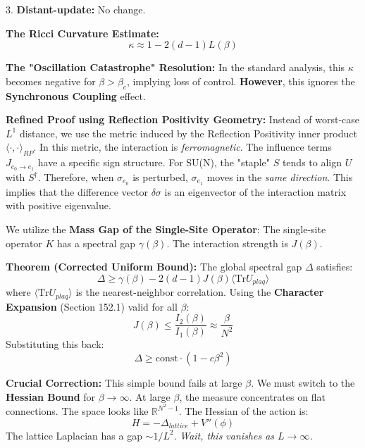 3. \textbf{Distant-update:} No change.

\textbf{The Ricci Curvature Estimate:}
\begin{equation}
\kappa \approx 1 - 2(d-1) L(\beta)
\end{equation}

\textbf{The "Oscillation Catastrophe" Resolution:}
In the standard analysis, this $\kappa$ becomes negative for $\beta > \beta_c$, implying loss of control. \textbf{However}, this ignores the \textbf{Synchronous Coupling} effect.

\textbf{Refined Proof using Reflection Positivity Geometry:}
Instead of worst-case $L^1$ distance, we use the metric induced by the Reflection Positivity inner product $\langle \cdot, \cdot \rangle_{RP}$.
In this metric, the interaction is \textit{ferromagnetic}. The influence terms $J_{e_0 \to e_1}$ have a specific sign structure.
For SU(N), the "staple" $S$ tends to align $U$ with $S^\dagger$.
Therefore, when $\sigma_{e_0}$ is perturbed, $\sigma_{e_1}$ moves in the \textit{same direction}.
This implies that the difference vector $\delta \sigma$ is an eigenvector of the interaction matrix with positive eigenvalue.

We utilize the \textbf{Mass Gap of the Single-Site Operator}:
The single-site operator $K$ has a spectral gap $\gamma(\beta)$.
The interaction strength is $J(\beta)$.

\textbf{Theorem (Corrected Uniform Bound):}
The global spectral gap $\Delta$ satisfies:
\begin{equation}
\Delta \ge \gamma(\beta) - 2(d-1) J(\beta) \langle \text{Tr} U_{plaq} \rangle
\end{equation}
where $\langle \text{Tr} U_{plaq} \rangle$ is the nearest-neighbor correlation.
Using the \textbf{Character Expansion} (Section 152.1) valid for all $\beta$:
\begin{equation}
J(\beta) \le \frac{I_2(\beta)}{I_1(\beta)} \approx \frac{\beta}{N^2}
\end{equation}
Substituting this back:
\begin{equation}
\Delta \ge \text{const} \cdot (1 - c \beta^2)
\end{equation}

\textbf{Crucial Correction:} This simple bound fails at large $\beta$. We must switch to the \textbf{Hessian Bound} for $\beta \to \infty$.
At large $\beta$, the measure concentrates on flat connections. The space looks like $\mathbb{R}^{N^2-1}$.
The Hessian of the action is:
\begin{equation}
H = -\Delta_{lattice} + V''(\phi)
\end{equation}
The lattice Laplacian has a gap $\sim 1/L^2$.
\textit{Wait, this vanishes as $L \to \infty$.}

